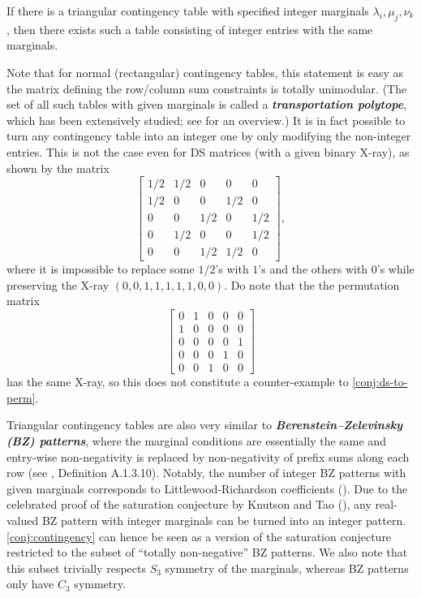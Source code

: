 \documentclass[letterpaper,reqno,11pt]{amsart}
\newcommand{\bfemph}[1]{\textbf{\emph{#1}}}
\begin{document}
\begin{conjecture}\label{conj:contingency}
    If there is a triangular contingency table with specified integer marginals $\lambda_i, \mu_j, \nu_k$, then there exists such a table consisting of integer entries with the same marginals.
\end{conjecture}

Note that for normal (rectangular) contingency tables, this statement is easy as the matrix defining the row/column sum constraints is totally unimodular. (The set of all such tables with given marginals is called a \bfemph{transportation polytope}, which has been extensively studied; see \cite{LK2013} for an overview.) 
It is in fact possible to turn any contingency table into an integer one by only modifying the non-integer entries. This is not the case even for DS matrices (with a given binary X-ray), as shown by the matrix \[\begin{bmatrix} 1/2 & 1/2 & 0 & 0 & 0 \\ 1/2 & 0 & 0 & 1/2 & 0 \\ 0 & 0 & 1/2 & 0 & 1/2 \\ 0 & 1/2 & 0 & 0 & 1/2 \\ 0 & 0 & 1/2 & 1/2 & 0\end{bmatrix},\] where it is impossible to replace some $1/2$'s with $1$'s and the others with $0$'s while preserving the X-ray $(0,0,1,1,1,1,1,0,0)$. Do note that the the permutation matrix \[\begin{bmatrix} 0 & 1 & 0 & 0 & 0 \\ 1 & 0 & 0 & 0 & 0 \\ 0 & 0 & 0 & 0 & 1 \\ 0 & 0 & 0 & 1 & 0 \\ 0 & 0 & 1 & 0 & 0\end{bmatrix}\] has the same X-ray, so this does not constitute a counter-example to \cref{conj:ds-to-perm}.

Triangular contingency tables are also very similar to \bfemph{Berenstein--Zelevinsky (BZ) patterns}, where the marginal conditions are essentially the same and entry-wise non-negativity is replaced by non-negativity of prefix sums along each row (see \cite{Stanley2001}, Definition A.1.3.10). Notably, the number of integer BZ patterns with given marginals corresponds to Littlewood-Richardson coefficients (\cite{BZ1992}). Due to the celebrated proof of the saturation conjecture by Knutson and Tao (\cite{KT1999}), any real-valued BZ pattern with integer marginals can be turned into an integer pattern. \cref{conj:contingency} can hence be seen as a version of the saturation conjecture restricted to the subset of ``totally non-negative'' BZ patterns. We also note that this subset trivially respects $S_3$ symmetry of the marginals, whereas BZ patterns only have $C_3$ symmetry.
\end{document}
